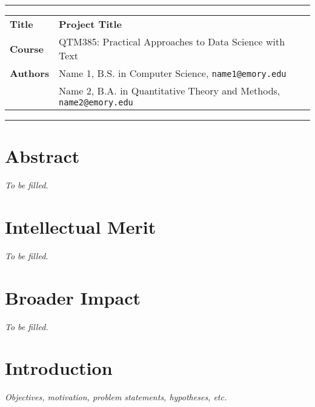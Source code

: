 \documentclass[10pt]{article}
\begin{document}
\thispagestyle{empty}

\hrule
\vspace{1mm}
\noindent\begin{tabular}{ll}
\bf Title   & \textbf{Project Title} \\
\bf Course  & QTM385: Practical Approaches to Data Science with Text \\
\bf Authors & Name 1, B.S. in Computer Science, \texttt{name1@emory.edu} \\ 
            & Name 2, B.A. in Quantitative Theory and Methods, \texttt{name2@emory.edu} \\ 
\end{tabular}
\vspace{1mm}
\hrule


\section*{Abstract}

\textit{To be filled.}


\section*{Intellectual Merit}

\textit{To be filled.}


\section*{Broader Impact}

\textit{To be filled.}

\pagebreak


\section{Introduction}

\textit{Objectives, motivation, problem statements, hypotheses, etc.}

\end{document}
